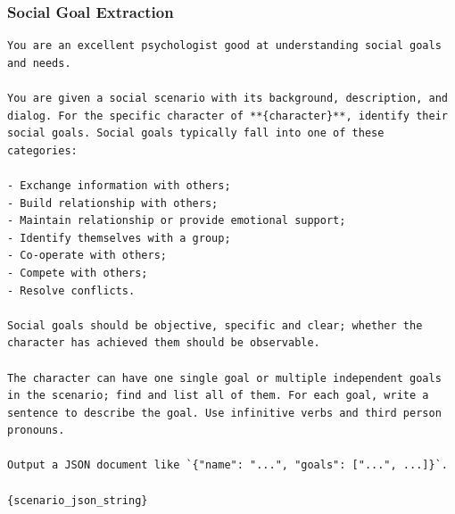 \subsubsection{Social Goal Extraction}

\begin{tcolorbox}[width=\linewidth]
\begin{lstlisting}[caption=Original Social Goal Extraction]
You are an excellent psychologist good at understanding social goals and needs.

You are given a social scenario with its background, description, and dialog. For the specific character of **{character}**, identify their social goals. Social goals typically fall into one of these categories:

- Exchange information with others;
- Build relationship with others;
- Maintain relationship or provide emotional support;
- Identify themselves with a group;
- Co-operate with others;
- Compete with others;
- Resolve conflicts.

Social goals should be objective, specific and clear; whether the character has achieved them should be observable.

The character can have one single goal or multiple independent goals in the scenario; find and list all of them. For each goal, write a sentence to describe the goal. Use infinitive verbs and third person pronouns.

Output a JSON document like `{"name": "...", "goals": ["...", ...]}`.

{scenario_json_string}
\end{lstlisting}
\end{tcolorbox}

